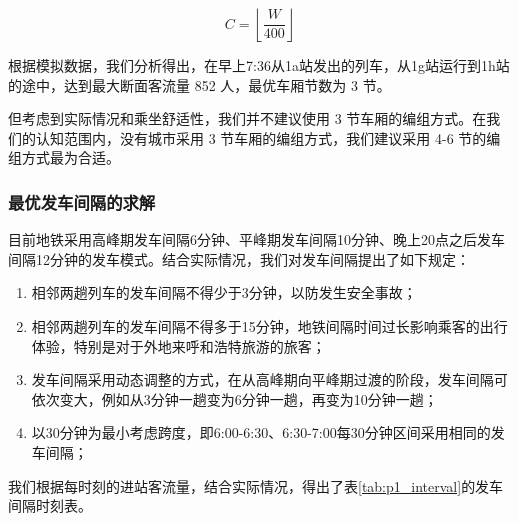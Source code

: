 \documentclass[12pt,a4paper]{mcmthesis}
\begin{document}
    \begin{equation}
        C = \left\lfloor \frac{W}{400} \right\rfloor
        \label{eq:p1_def-max-car}
    \end{equation}

    根据模拟数据，我们分析得出，在早上7:36从1a站发出的列车，从1g站运行到1h站的途中，达到最大断面客流量 852 人，最优车厢节数为 3 节。

    但考虑到实际情况和乘坐舒适性，我们并不建议使用 3 节车厢的编组方式。在我们的认知范围内，没有城市采用 3 节车厢的编组方式，我们建议采用 4-6 节的编组方式最为合适。

    \subsubsection{最优发车间隔的求解}

    目前地铁采用高峰期发车间隔6分钟、平峰期发车间隔10分钟、晚上20点之后发车间隔12分钟的发车模式。结合实际情况，我们对发车间隔提出了如下规定：

    \begin{enumerate}
        \item 相邻两趟列车的发车间隔不得少于3分钟，以防发生安全事故；
        \item 相邻两趟列车的发车间隔不得多于15分钟，地铁间隔时间过长影响乘客的出行体验，特别是对于外地来呼和浩特旅游的旅客；
        \item 发车间隔采用动态调整的方式，在从高峰期向平峰期过渡的阶段，发车间隔可依次变大，例如从3分钟一趟变为6分钟一趟，再变为10分钟一趟；
        \item 以30分钟为最小考虑跨度，即6:00-6:30、6:30-7:00每30分钟区间采用相同的发车间隔；
    \end{enumerate}

    我们根据每时刻的进站客流量，结合实际情况，得出了表\ref{tab:p1_interval}的发车间隔时刻表。
\end{document}
